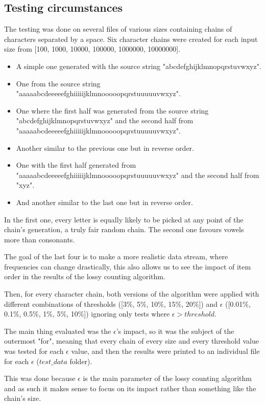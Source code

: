 \documentclass[...]{revdetua}
\begin{document}
\subsection{Testing circumstances}
The testing was done on several files of various sizes containing chains of characters separated by a space.
Six character chains were created for each input size from [100, 1000, 10000, 100000, 1000000, 10000000].
\begin{itemize}
\item A simple one generated with the source string "abcdefghijklmnopqrstuvwxyz".
\item One from the source string "aaaaabcdeeeeefghiiiiijklmnooooopqrstuuuuuvwxyz".
\item One where the first half was generated from the source string "abcdefghijklmnopqrstuvwxyz" and the second half from "aaaaabcdeeeeefghiiiiijklmnooooopqrstuuuuuvwxyz".
\item Another similar to the previous one but in reverse order.
\item One with the first half generated from "aaaaabcdeeeeefghiiiiijklmnooooopqrstuuuuuvwxyz" and the second half from "xyz".
\item And another similar to the last one but in reverse order.  
\end{itemize}

In the first one, every letter is equally likely to be picked at any point of the chain's generation, a truly fair random chain.
The second one favours vowels more than consonants.\par
The goal of the last four is to make a more realistic data stream, where frequencies can change drastically, this also allows us to see the impact of item order in the results of the lossy counting algorithm.\par 
Then, for every character chain, both versions of the algorithm were applied with different combinations of thresholds ([3\%, 5\%, 10\%, 15\%, 20\%]) and $\epsilon$ ([0.01\%, 0.1\%, 0.5\%, 1\%, 5\%, 10\%]) ignoring only tests where $\epsilon>threshold$. \par
The main thing evaluated was the $\epsilon$'s impact, so it was the subject of the outermost "for", meaning that every chain of every size and every threshold value was tested for each $\epsilon$ value, and then the results were printed to an individual file for each $\epsilon$ ($test\_data$ folder).\par
This was done because $\epsilon$ is the main parameter of the lossy counting algorithm and as such it makes sense to focus on its impact rather than something like the chain's size.\par
\end{document}

